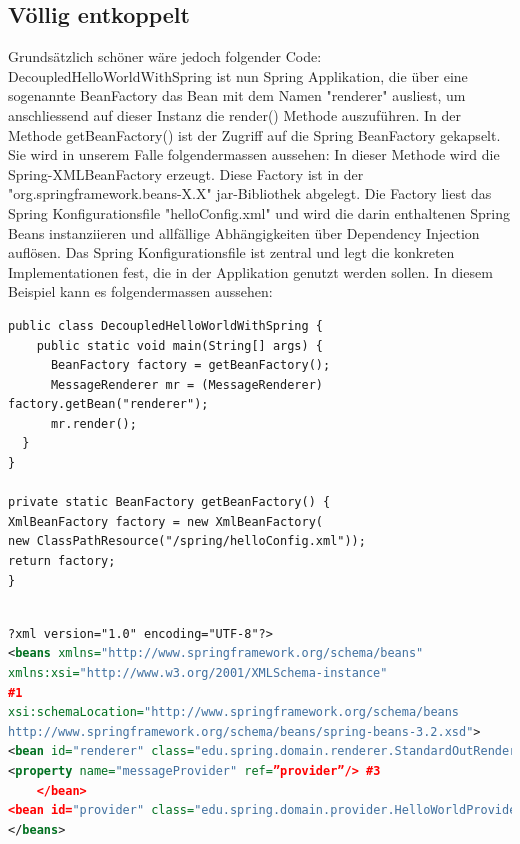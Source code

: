 \documentclass[a4paper,10pt]{scrreprt}
\begin{document}
\subsection{Völlig entkoppelt}
Grundsätzlich schöner wäre jedoch folgender Code:
DecoupledHelloWorldWithSpring ist nun Spring Applikation, die über eine sogenannte
BeanFactory das Bean mit dem Namen "renderer" ausliest, um anschliessend auf dieser Instanz die
render() Methode auszuführen.
In der Methode getBeanFactory() ist der Zugriff auf die Spring BeanFactory gekapselt. Sie wird
in unserem Falle folgendermassen aussehen:
In dieser Methode wird die Spring-XMLBeanFactory erzeugt. Diese Factory ist in der
"org.springframework.beans-X.X" jar-Bibliothek abgelegt. Die Factory liest das Spring
Konfigurationsfile "helloConfig.xml" und wird die darin enthaltenen Spring Beans instanziieren und
allfällige Abhängigkeiten über Dependency Injection auflösen.
Das Spring Konfigurationsfile ist zentral und legt die konkreten Implementationen fest, die in der
Applikation genutzt werden sollen. In diesem Beispiel kann es folgendermassen aussehen:

\begin{lstlisting}[caption=Depedancy Injection with Spring]
 public class DecoupledHelloWorldWithSpring {
    public static void main(String[] args) {
      BeanFactory factory = getBeanFactory();
      MessageRenderer mr = (MessageRenderer) factory.getBean("renderer");
      mr.render();
  }
}

private static BeanFactory getBeanFactory() {
XmlBeanFactory factory = new XmlBeanFactory(
new ClassPathResource("/spring/helloConfig.xml"));
return factory;
}


\end{lstlisting}
\begin{lstlisting}[caption=Spring Config Datei,language=xml]
 ?xml version="1.0" encoding="UTF-8"?>
<beans xmlns="http://www.springframework.org/schema/beans"
xmlns:xsi="http://www.w3.org/2001/XMLSchema-instance"
#1
xsi:schemaLocation="http://www.springframework.org/schema/beans
http://www.springframework.org/schema/beans/spring-beans-3.2.xsd">
<bean id="renderer" class="edu.spring.domain.renderer.StandardOutRenderer"> #2
<property name="messageProvider" ref=”provider”/> #3
    </bean> 
<bean id="provider" class="edu.spring.domain.provider.HelloWorldProvider" /> #4
</beans>
\end{lstlisting}
\end{document}
